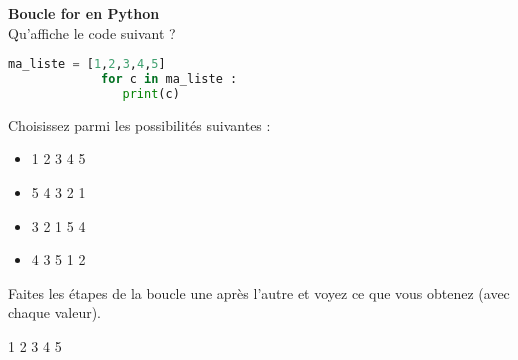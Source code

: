      	
    \begin{Exercice}[5 minutes] \textbf{Boucle for en Python}\\
      	Qu'affiche le code suivant ?
      	
      	\begin{lstlisting}[language=Python]
             ma_liste = [1,2,3,4,5]
             for c in ma_liste :
             	print(c) 
             	\end{lstlisting}
             	
        Choisissez parmi les possibilités suivantes :
        
        \begin{itemize}
        \item 
        1  
        2 
        3 
        4 
        5 
        \item 
        5 
        4 
        3 
        2 
        1 
        \item 3 
        2 
        1 
        5 
        4 
        \item 4 
        3 
        5 
        1 
        2
        \end{itemize}
    
        \begin{conseil}
		   Faites les étapes de la boucle une après l'autre et voyez ce que vous obtenez (avec chaque valeur).  
        \end{conseil}
        
        \begin{solution}
            1 
            2 
            3 
            4 
            5
        \end{solution}
    \end{Exercice}
    
